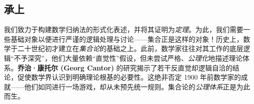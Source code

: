\subsection{承上}

我们致力于构建数学归纳法的形式化表述，并将其证明为\emph{定理}。为此，我们需要一些基础对象以便进行严谨的逻辑处理与讨论——集合正是这样的对象！历史上，数学于二十世纪初才建立在\emph{集合论}的基础之上。此前，数学家往往对其工作的底层逻辑``不予深究''，他们大量依赖``直觉性''假设，但未尝试严格、\emph{公理化}地描述理论体系。\textbf{乔治·康托尔 (Georg Cantor)} 的研究揭示了若干反直觉却逻辑自洽的结论，促使数学界认识到明确理论根基的必要性。这绝非否定 1900 年前数学家的成就——他们如同进行一场游戏，却从未预先统一规则。集合论的\emph{公理体系}正是为此而生。
